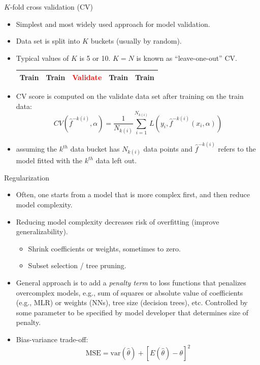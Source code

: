 \documentclass[aspectratio=169]{beamer}
\begin{document}
\begin{frame}{$K$-fold cross validation (CV)}
    \begin{itemize}
        \item Simplest and most widely used approach for model validation.
        \item Data set is split into $K$ buckets (usually by random).
        \item Typical values of $K$ is 5 or 10. $K = N$ is known as ``leave-one-out'' CV.
        \begin{table}
        \begin{tabular}{|p{1.7cm}|p{1.7cm}|p{1.7cm}|p{1.7cm}|p{1.7cm}|}
            \hline
            \Large{Train} & \Large{Train} & \textcolor{red}{\Large{Validate}} & \Large{Train} & \Large{Train}\\
            \hline
        \end{tabular}
        \end{table}
        \item CV score is computed on the validate data set after training on the train data:
        \begin{equation*}
                CV(\hat{f}^{-k(i)},\alpha) = \frac{1}{N_{k(i)}}\sum_{i=1}^{N_{k(i)}} L(y_i, \hat{f}^{-k(i)}(x_i,\alpha))
        \end{equation*}
        \item assuming the $k^{th}$ data bucket has $N_{k(i)}$ data points and $\hat{f}^{-k(i)}$ refers to the model fitted with the $k^{th}$ data left out.
    \end{itemize}
\end{frame}


\begin{frame}{Regularization}
    \begin{itemize}
        \item Often, one starts from a model that is more complex first, and then reduce model complexity.
        \item Reducing model complexity decreases risk of overfitting (improve generalizability).
        \begin{itemize}
            \item Shrink coefficients or weights, sometimes to zero.
            \item Subset selection / tree pruning.
        \end{itemize}
        \item General approach is to add a \textit{penalty term} to loss functions that penalizes overcomplex models, e.g., sum of squares or absolute value of coefficients (e.g., MLR) or weights (NNs), tree size (decision trees), etc. Controlled by some parameter to be specified by model developer that determines size of penalty.
        \item Bias-variance trade-off:
        \begin{equation*}
            \mathrm{MSE} = \mathrm{var}(\hat{\theta}) + [E(\hat{\theta}) - \theta]^2
        \end{equation*}
    \end{itemize}
\end{frame}
\end{document}
